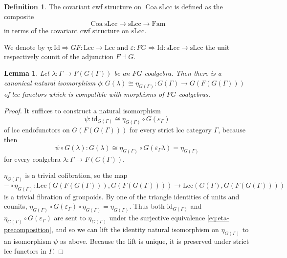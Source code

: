 \documentclass[a4paper]{article}
\newtheorem{lemma}[theorem]{Lemma}
\theoremstyle{remark}
\theoremstyle{definition}
\newtheorem{definition}[theorem]{Definition}
\begin{document}
\begin{definition}
  The covariant cwf structure on $\operatorname{Coa} \mathrm{sLcc}$ is defined as the composite
  \begin{equation}
    \operatorname{Coa} \mathrm{sLcc} \rightarrow \mathrm{sLcc} \rightarrow \mathrm{Fam}
  \end{equation}
  in terms of the covariant cwf structure on $\mathrm{sLcc}$.
\end{definition}

We denote by $\eta : \mathrm{Id} \Rightarrow G F : \mathrm{Lcc} \rightarrow \mathrm{Lcc}$ and $\varepsilon : F G \Rightarrow \mathrm{Id} : \mathrm{sLcc} \rightarrow \mathrm{sLcc}$ the unit respectively counit of the adjunction $F \dashv G$.

\begin{lemma}
  \label{lem:coalgebra-vs-eta}
  Let $\lambda : \Gamma \rightarrow F(G(\Gamma))$ be an $FG$-coalgebra.
  Then there is a canonical natural isomorphism $\phi : G(\lambda) \cong \eta_{G(\Gamma)} : G(\Gamma) \rightarrow G(F(G(\Gamma)))$ of lcc functors which is compatible with morphisms of $FG$-coalgebras.
\end{lemma}
\begin{proof}
  It suffices to construct a natural isomorphism
  \begin{equation}
    \psi : \mathrm{id}_{G(\Gamma)} \cong \eta_{G(\Gamma)} \circ G(\varepsilon_\Gamma)
  \end{equation}
  of lcc endofunctors on $G(F(G(\Gamma)))$ for every strict lcc category $\Gamma$, because then
  \begin{equation}
    \psi \circ G(\lambda) : G(\lambda) \cong \eta_{G(\Gamma)} \circ G(\varepsilon_\Gamma \lambda) = \eta_{G(\Gamma)}
  \end{equation}
  for every coalgebra $\lambda : \Gamma \rightarrow F(G(\Gamma))$.

  $\eta_{G(\Gamma)}$ is a trivial cofibration, so the map
  \begin{equation}
    \label{eq:eta-precomposition}
    - \circ \eta_{G(\Gamma)} : \mathrm{Lcc}(G(F(G(\Gamma))), G(F(G(\Gamma)))) \rightarrow \mathrm{Lcc}(G(\Gamma), G(F(G(\Gamma)))) 
  \end{equation}
  is a trivial fibration of groupoids.
  By one of the triangle identities of units and counits, $\eta_{G(\Gamma)} \circ G(\varepsilon_\Gamma) \circ \eta_{G(\Gamma)} = \eta_{G(\Gamma)}$.
  Thus both $\mathrm{id}_{G(\Gamma)}$ and $\eta_{G(\Gamma)} \circ G(\varepsilon_\Gamma)$ are sent to $\eta_{G(\Gamma)}$ under the surjective equivalence \eqref{eq:eta-precomposition}, and so we can lift the identity natural isomorphism on $\eta_{G(\Gamma)}$ to an isomorphism $\psi$ as above.
  Because the lift is unique, it is preserved under strict lcc functors in $\Gamma$.
\end{proof}
\end{document}
